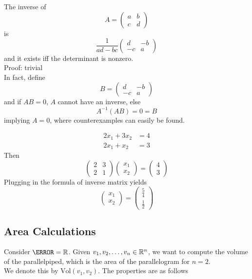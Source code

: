 \documentclass[12pt]{article}
\begin{document}
\begin{lem}
	The inverse of $$A = \begin{pmatrix} a & b \\ c & d \end{pmatrix}$$
	is
	$$\frac{1}{ad - bc} \begin{pmatrix} d & -b \\ -c & a \end{pmatrix}$$
	and it exists iff the determinant is nonzero. \\
	Proof: trivial \\
	In fact, define
	$$B = \begin{pmatrix} d & -b \\ -c & a \end{pmatrix}$$
	and if $AB = 0$, $A$ cannot have an inverse, else
	$$A^{-1}(AB) = 0 = B$$
	implying $A = 0$, where counterexamples can easily be found.
\end{lem}

\begin{ex}
	\begin{align*}
		2x_1 + 3x_2 &= 4 \\
		2x_1 + x_2 &= 3
	\end{align*}
	Then
	$$\begin{pmatrix} 2 & 3 \\ 2 & 1 \end{pmatrix} \begin{pmatrix} x_1 \\ x_2 \end{pmatrix} = \begin{pmatrix} 4 \\ 3 \end{pmatrix}$$
	Plugging in the formula of inverse matrix yields
	$$\begin{pmatrix} x_1 \\ x_2 \end{pmatrix} = \begin{pmatrix} \frac{5}{4} \\ \frac{1}{2} \end{pmatrix}$$
\end{ex}

\subsection{Area Calculations}

Consider $\F = \R$. Given $v_1, v_2, \dots, v_n \in \mathbb{R}^n$, we want to compute the volume of the parallelpiped, which is the area of the parallelogram for $n=2$. \\
We denote this by $\mathrm{Vol}(v_1, v_2)$. The properties are as follows
\end{document}
